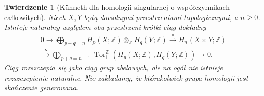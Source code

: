 \documentclass[11pt,a4paper,oneside]{report}
\newcommand{\Z}{\mathbb{Z}}
\theoremstyle{plain}
\newtheorem{twierdzenie}{Twierdzenie}[section]
\theoremstyle{definition}
\theoremstyle{remark}
\begin{document}
\begin{twierdzenie}[Künneth dla homologii singularnej o współczynnikach całkowitych]
\label{thm:kunneth-v4}
Niech $X,Y$ będą dowolnymi przestrzeniami topologicznymi, a $n\geq0$.
Istnieje naturalny względem obu przestrzeni krótki ciąg dokładny
\[
\begin{gathered}
0\longrightarrow
\bigoplus_{p+q=n}H_p(X;\Z)\otimes_\Z H_q(Y;\Z)
\xrightarrow{\ \times\ }H_n(X\times Y;\Z)\\
\xrightarrow{\ \kappa\ }
\bigoplus_{p+q=n-1}\operatorname{Tor}^{\Z}_1(H_p(X;\Z),H_q(Y;\Z))
\longrightarrow0.
\end{gathered}
\]
Ciąg rozszczepia się jako ciąg grup abelowych, ale na ogół nie istnieje
rozszczepienie naturalne. Nie zakładamy, że którakolwiek grupa homologii
jest skończenie generowana.
\end{twierdzenie}
\end{document}
